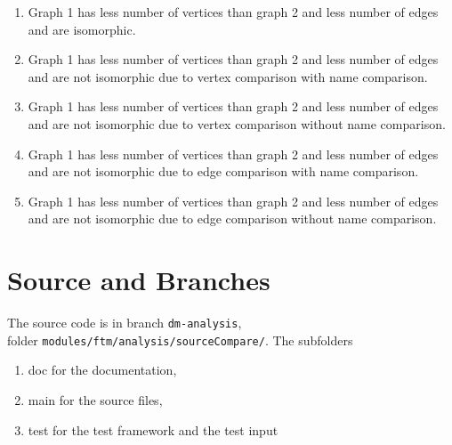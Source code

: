 \documentclass[12pt,a4paper]{report}
\begin{document}
\begin{enumerate}
  \item Graph 1 has less number of vertices than graph 2 and less number of edges and are isomorphic.
  \item Graph 1 has less number of vertices than graph 2 and less number of edges and are not isomorphic due to vertex comparison with name comparison.
  \item Graph 1 has less number of vertices than graph 2 and less number of edges and are not isomorphic due to vertex comparison without name comparison.
  \item Graph 1 has less number of vertices than graph 2 and less number of edges and are not isomorphic due to edge comparison with name comparison.
  \item Graph 1 has less number of vertices than graph 2 and less number of edges and are not isomorphic due to edge comparison without name comparison.
\end{enumerate}

\chapter{Source and Branches}
The source code is in branch \texttt{dm-analysis}, \\
folder \texttt{modules/ftm/analysis/sourceCompare/}. The subfolders
\begin{enumerate}
  \item doc for the documentation,
  \item main for the source files,
  \item test for the test framework and the test input
\end{enumerate}
\end{document}
